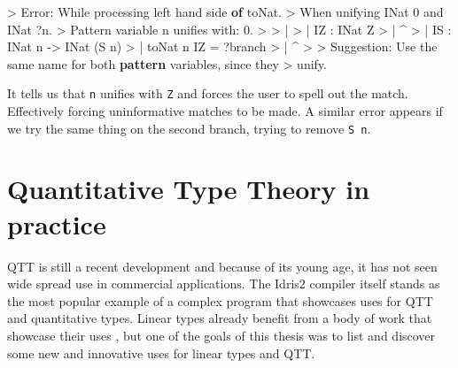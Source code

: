 \documentclass[
]{article}
\newenvironment{Shaded}{}{}
\newcommand{\DataTypeTok}[1]{\textcolor[rgb]{0.56,0.13,0.00}{#1}}
\newcommand{\DecValTok}[1]{\textcolor[rgb]{0.25,0.63,0.44}{#1}}
\newcommand{\FunctionTok}[1]{\textcolor[rgb]{0.02,0.16,0.49}{#1}}
\newcommand{\KeywordTok}[1]{\textcolor[rgb]{0.00,0.44,0.13}{\textbf{#1}}}
\newcommand{\NormalTok}[1]{#1}
\newcommand{\OperatorTok}[1]{\textcolor[rgb]{0.40,0.40,0.40}{#1}}
\newcommand{\OtherTok}[1]{\textcolor[rgb]{0.00,0.44,0.13}{#1}}
\begin{document}
\begin{Shaded}
\begin{Highlighting}[]
\OperatorTok{\textgreater{}} \DataTypeTok{Error}\OperatorTok{:} \DataTypeTok{While}\NormalTok{ processing left hand side }\KeywordTok{of}\NormalTok{ toNat}\OperatorTok{.} 
\OperatorTok{\textgreater{}}   \DataTypeTok{When}\NormalTok{ unifying }\DataTypeTok{INat} \DecValTok{0} \FunctionTok{and} \DataTypeTok{INat} \OperatorTok{?}\NormalTok{n}\OperatorTok{.}
\OperatorTok{\textgreater{}} \DataTypeTok{Pattern}\NormalTok{ variable n unifies with}\OperatorTok{:} \DecValTok{0}\OperatorTok{.}
\OperatorTok{\textgreater{}} 
\OperatorTok{\textgreater{}}     \OperatorTok{|}
\OperatorTok{\textgreater{}}     \OperatorTok{|}   \DataTypeTok{IZ} \OperatorTok{:} \DataTypeTok{INat} \DataTypeTok{Z}
\OperatorTok{\textgreater{}}     \OperatorTok{|}             \OperatorTok{\^{}}
\OperatorTok{\textgreater{}}     \OperatorTok{|}   \DataTypeTok{IS} \OperatorTok{:} \DataTypeTok{INat}\NormalTok{ n }\OtherTok{{-}\textgreater{}} \DataTypeTok{INat}\NormalTok{ (}\DataTypeTok{S}\NormalTok{ n)}
\OperatorTok{\textgreater{}}     \OperatorTok{|}\NormalTok{  toNat n }\DataTypeTok{IZ} \OtherTok{=} \OperatorTok{?}\NormalTok{branch}
\OperatorTok{\textgreater{}}     \OperatorTok{|}        \OperatorTok{\^{}}
\OperatorTok{\textgreater{}} 
\OperatorTok{\textgreater{}} \DataTypeTok{Suggestion}\OperatorTok{:} \DataTypeTok{Use}\NormalTok{ the same name for both }\KeywordTok{pattern}\NormalTok{ variables, since they }
\OperatorTok{\textgreater{}}\NormalTok{   unify}\OperatorTok{.}
\end{Highlighting}
\end{Shaded}

It tells us that \texttt{n} unifies with \texttt{Z} and forces the user
to spell out the match. Effectively forcing uninformative matches to be
made. A similar error appears if we try the same thing on the second
branch, trying to remove \texttt{S\ n}.

\newpage

\hypertarget{quantitative-type-theory-in-practice}{%
\section{Quantitative Type Theory in
practice}\label{quantitative-type-theory-in-practice}}

QTT is still a recent development and because of its young age, it has
not seen wide spread use in commercial applications. The Idris2 compiler
itself stands as the most popular example of a complex program that
showcases uses for QTT and quantitative types. Linear types already
benefit from a body of work that showcase their uses
\cite{linear_diff}\cite{linear_types_update}\cite{linear_types_session}\cite{linear_types_subst}\cite{actor_channels}\cite{linear_race}\cite{linear_use}\cite{once_upon_a_type}\cite{deforestations},
but one of the goals of this thesis was to list and discover some new
and innovative uses for linear types and QTT.
\end{document}
